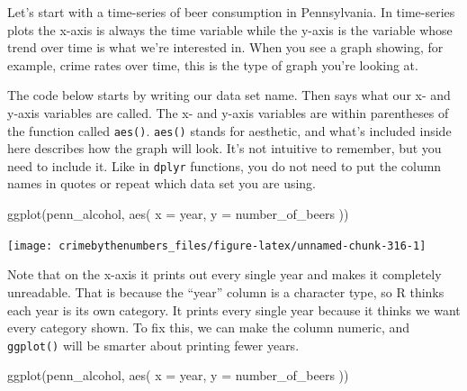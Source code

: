 \documentclass[
  a4paper,
]{krantz}
\makeatletter
\newenvironment{Shaded}{\begin{snugshade}}{\end{snugshade}}
\newcommand{\AttributeTok}[1]{\textcolor[rgb]{0.77,0.63,0.00}{#1}}
\newcommand{\FunctionTok}[1]{\textcolor[rgb]{0.00,0.00,0.00}{#1}}
\newcommand{\NormalTok}[1]{#1}
\newcommand{\OtherTok}[1]{\textcolor[rgb]{0.56,0.35,0.01}{#1}}
\newcommand{\SpecialCharTok}[1]{\textcolor[rgb]{0.00,0.00,0.00}{#1}}
\newenvironment{kframe}{%
\medskip{}
\setlength{\fboxsep}{.8em}
 \def\at@end@of@kframe{}%
 \ifinner\ifhmode%
  \def\at@end@of@kframe{\end{minipage}}%
  \begin{minipage}{\columnwidth}%
 \fi\fi%
 \def\FrameCommand##1{\hskip\@totalleftmargin \hskip-\fboxsep
 \colorbox{shadecolor}{##1}\hskip-\fboxsep
     \hskip-\linewidth \hskip-\@totalleftmargin \hskip\columnwidth}%
 \MakeFramed {\advance\hsize-\width
   \@totalleftmargin\z@ \linewidth\hsize
   \@setminipage}}%
 {\par\unskip\endMakeFramed%
 \at@end@of@kframe}
\renewenvironment{Shaded}{\begin{kframe}}{\end{kframe}}
\makeatother
\begin{document}
Let's start with a time-series of beer consumption in
Pennsylvania. In time-series plots the x-axis is always the
time variable while the y-axis is the variable whose trend
over time is what we're interested in. When you see a graph
showing, for example, crime rates over time, this is the
type of graph you're looking at.

The code below starts by writing our data set name. Then
says what our x- and y-axis variables are called. The x- and
y-axis variables are within parentheses of the function
called \texttt{aes()}. \texttt{aes()} stands for aesthetic,
and what's included inside here describes how the graph will
look. It's not intuitive to remember, but you need to
include it. Like in \texttt{dplyr} functions, you do not
need to put the column names in quotes or repeat which data
set you are using.

\begin{Shaded}
\begin{Highlighting}[]
\FunctionTok{ggplot}\NormalTok{(penn\_alcohol, }\FunctionTok{aes}\NormalTok{(}
  \AttributeTok{x =}\NormalTok{ year,}
  \AttributeTok{y =}\NormalTok{ number\_of\_beers}
\NormalTok{))}
\end{Highlighting}
\end{Shaded}

\begin{center}\texttt{[image: crimebythenumbers\_files/figure-latex/unnamed-chunk-316-1]} \end{center}

Note that on the x-axis it prints out every single year and
makes it completely unreadable. That is because the ``year''
column is a character type, so R thinks each year is its own
category. It prints every single year because it thinks we
want every category shown. To fix this, we can make the
column numeric, and \texttt{ggplot()} will be smarter about
printing fewer years.

\begin{Shaded}
\end{Shaded}

\begin{Shaded}
\begin{Highlighting}[]
\FunctionTok{ggplot}\NormalTok{(penn\_alcohol, }\FunctionTok{aes}\NormalTok{(}
  \AttributeTok{x =}\NormalTok{ year,}
  \AttributeTok{y =}\NormalTok{ number\_of\_beers}
\NormalTok{))}
\end{Highlighting}
\end{Shaded}
\end{document}
